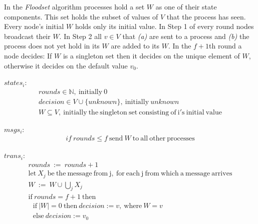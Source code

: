 \documentclass[fleqn]{article}
\begin{document}
In the \textit{Floodset} algorithm processes hold a set $W$ as one of their state components. This set holds the subset of values of $V$ that the process has seen. Every node's initial $W$ holds only its initial value.
In Step 1 of every round nodes broadcast their $W$. In Step 2 all $v \in V$ that \textit{(a)} are sent to a process and \textit{(b)} the process does not yet hold in its $W$ are added to its $W$. In the $f+1$th round
a node decides: If $W$ is a singleton set then it decides on the unique element of $W$, otherwise it decides on the default value $v_0$.

\begin{mdframed}[backgroundcolor=light-gray, roundcorner=10pt,leftmargin=1, rightmargin=1, innerleftmargin=15, innertopmargin=15,innerbottommargin=15, outerlinewidth=1, linecolor=light-gray]
\noindent $states_i$:
\begin{gather*}
  rounds   \in  \mathbb{N}, \ \mathrm{initially} \ 0 \\
  decision  \in  V \cup \{ unknown \}, \ \mathrm{initially} \ unknown \\
  W \subseteq V, \ \mathrm{initially \ the\  singleton\  set\  consisting\  of\  i's\  initial\  value}
\end{gather*}
\end{mdframed}

\begin{mdframed}[backgroundcolor=light-gray, roundcorner=10pt,leftmargin=1, rightmargin=1, innerleftmargin=15, innertopmargin=15,innerbottommargin=15, outerlinewidth=1, linecolor=light-gray]
\noindent $msgs_i$:
\begin{gather*}
  if\ rounds \le f\ \mathrm{send}\ W\ \mathrm{to\ all\ other\ processes}
\end{gather*}
\end{mdframed}


\begin{mdframed}[backgroundcolor=light-gray, roundcorner=10pt,leftmargin=1, rightmargin=1, innerleftmargin=15, innertopmargin=15,innerbottommargin=15, outerlinewidth=1, linecolor=light-gray]
\noindent $trans_i$:
\begin{gather*}
  rounds\ :=\ rounds+1\\
  \mathrm{let}\ X_j\ \mathrm{be\ the\ message\ from\ j,\ for\ each\ j\ from\ which\ a\ message\ arrives}\\
  W\ :=\ W \cup \bigcup_{j} X_j\\
  \mathrm{if}\ rounds = f+1\ \mathrm{then}\\
  \ \ \   \mathrm{if}\ |W| = 0\ \mathrm{then}\ decision := v,\ \mathrm{where}\ W = {v}\\
  \ \ \   \mathrm{else}\ decision := v_0
\end{gather*}
\end{mdframed}
\end{document}

